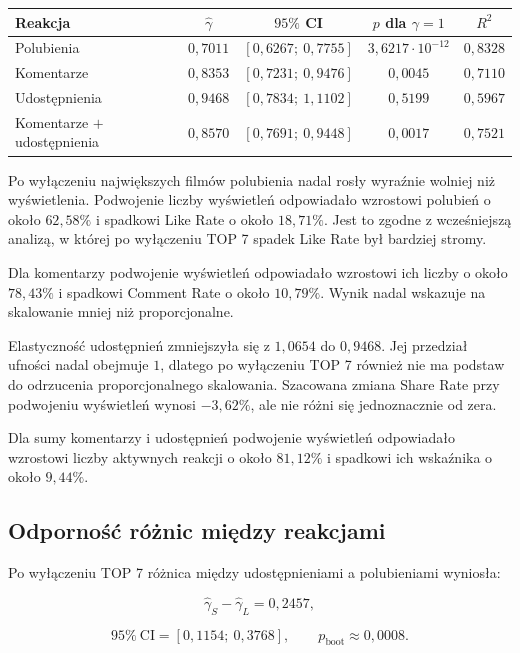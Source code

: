 \documentclass[12pt,a4paper]{article}
\begin{document}
\begin{center}
\small
\begin{tabular}{lcccc}
\toprule
Reakcja & $\widehat{\gamma}$ & $95\%$ CI & $p$ dla $\gamma=1$ & $R^2$ \\
\midrule
Polubienia & $0{,}7011$ & $[0{,}6267;\ 0{,}7755]$ & $3{,}6217\cdot10^{-12}$ & $0{,}8328$ \\
Komentarze & $0{,}8353$ & $[0{,}7231;\ 0{,}9476]$ & $0{,}0045$ & $0{,}7110$ \\
Udostępnienia & $0{,}9468$ & $[0{,}7834;\ 1{,}1102]$ & $0{,}5199$ & $0{,}5967$ \\
Komentarze $+$ udostępnienia & $0{,}8570$ & $[0{,}7691;\ 0{,}9448]$ & $0{,}0017$ & $0{,}7521$ \\
\bottomrule
\end{tabular}
\end{center}

Po wyłączeniu największych filmów polubienia nadal rosły wyraźnie wolniej niż wyświetlenia. Podwojenie liczby wyświetleń odpowiadało wzrostowi polubień o około $62{,}58\%$ i spadkowi Like Rate o około $18{,}71\%$. Jest to zgodne z wcześniejszą analizą, w której po wyłączeniu TOP 7 spadek Like Rate był bardziej stromy.

Dla komentarzy podwojenie wyświetleń odpowiadało wzrostowi ich liczby o około $78{,}43\%$ i spadkowi Comment Rate o około $10{,}79\%$. Wynik nadal wskazuje na skalowanie mniej niż proporcjonalne.

Elastyczność udostępnień zmniejszyła się z $1{,}0654$ do $0{,}9468$. Jej przedział ufności nadal obejmuje $1$, dlatego po wyłączeniu TOP 7 również nie ma podstaw do odrzucenia proporcjonalnego skalowania. Szacowana zmiana Share Rate przy podwojeniu wyświetleń wynosi $-3{,}62\%$, ale nie różni się jednoznacznie od zera.

Dla sumy komentarzy i udostępnień podwojenie wyświetleń odpowiadało wzrostowi liczby aktywnych reakcji o około $81{,}12\%$ i spadkowi ich wskaźnika o około $9{,}44\%$.

\subsection{Odporność różnic między reakcjami}

Po wyłączeniu TOP 7 różnica między udostępnieniami a polubieniami wyniosła:

\[
\widehat{\gamma}_{S}-\widehat{\gamma}_{L}
=0{,}2457,
\]

\[
95\%\ \mathrm{CI}=[0{,}1154;\ 0{,}3768],
\qquad
p_{\mathrm{boot}}\approx0{,}0008.
\]
\end{document}
